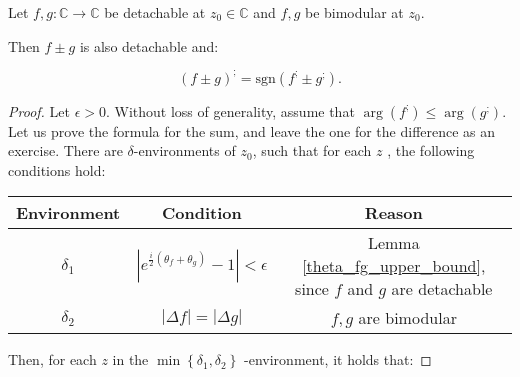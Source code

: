 \documentclass[11pt]{book}
\begin{document}
\begin{theorem}Let $f,g:\mathbb{C}\longrightarrow\mathbb{C}$ be detachable at $z_{0}\in\mathbb{C}$ and $f,g$ be bimodular at $z_{0}.$

Then $f\pm g$ is also detachable and:

$$\left(f\pm g\right)^{;}=\text{sgn}\left(f^{;}\pm g^{;}\right).$$
\label{complex_sum_rule}
\end{theorem}
\begin{proof}Let $\epsilon>0.$ Without loss of generality, assume that $\arg\left(f^{;}\right)\leq\arg\left(g^{;}\right).$ Let us prove the formula for the sum, and leave the one for the difference as an exercise. There are $\delta$-environments of $z_{0}$, such that for each $z$ , the following conditions hold:

\begin{table}[H]
\centering
        \begin{tabular}{ccc}
        \toprule
        \textbf{Environment} & \textbf{Condition} & \textbf{Reason} \\
        \midrule
        $\delta_1$ & $\left|e^{\frac{i}{2}\left(\theta_{f}+\theta_{g}\right)}-1\right|<\epsilon$ & Lemma \ref{theta_fg_upper_bound}, since $f$ and $g$ are detachable \\
        $\delta_2$ & $\left|\Delta f\right|=\left|\Delta g\right|$ & $f,g$ are bimodular \\
        \bottomrule
        \end{tabular}
\end{table}

Then, for each $z$ in the $\min\left\{ \delta_{1},\delta_{2}\right\}$ -environment, it holds that:


\end{proof}
\end{document}
